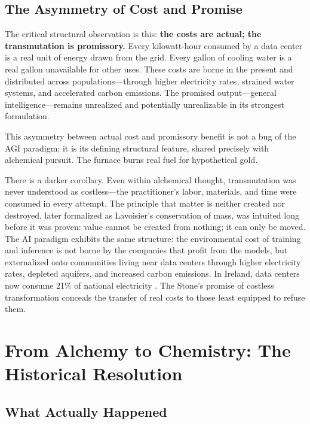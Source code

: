 \documentclass[12pt]{article}
\begin{document}
\subsection{The Asymmetry of Cost and Promise}
\label{sec:asymmetry}

The critical structural observation is this: \textbf{the costs are actual; the transmutation is promissory.} Every kilowatt-hour consumed by a data center is a real unit of energy drawn from the grid. Every gallon of cooling water is a real gallon unavailable for other uses. These costs are borne in the present and distributed across populations---through higher electricity rates, strained water systems, and accelerated carbon emissions. The promised output---general intelligence---remains unrealized and potentially unrealizable in its strongest formulation.

This asymmetry between actual cost and promissory benefit is not a bug of the AGI paradigm; it is its defining structural feature, shared precisely with alchemical pursuit. The furnace burns real fuel for hypothetical gold.

There is a darker corollary. Even within alchemical thought, transmutation was never understood as costless---the practitioner's labor, materials, and time were consumed in every attempt. The principle that matter is neither created nor destroyed, later formalized as Lavoisier's conservation of mass, was intuited long before it was proven: value cannot be created from nothing; it can only be moved. The AI paradigm exhibits the same structure: the environmental cost of training and inference is not borne by the companies that profit from the models, but externalized onto communities living near data centers through higher electricity rates, depleted aquifers, and increased carbon emissions. In Ireland, data centers now consume 21\% of national electricity \citep{eirgrid2025}. The Stone's promise of costless transformation conceals the transfer of real costs to those least equipped to refuse them.

\section{From Alchemy to Chemistry: The Historical Resolution}
\label{sec:history}

\subsection{What Actually Happened}
\label{sec:whathappened}
\end{document}
